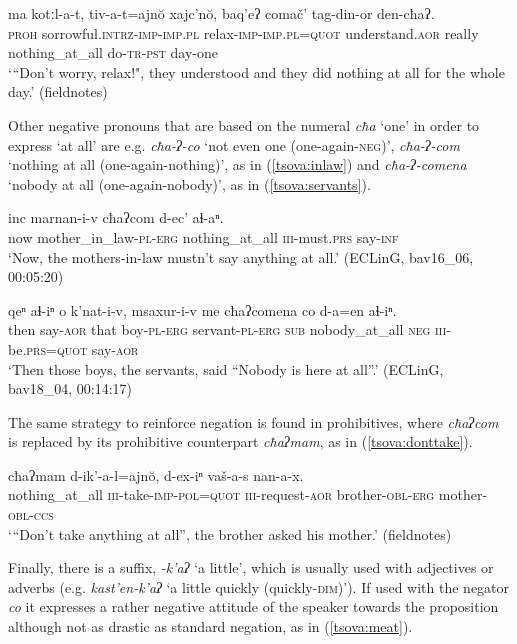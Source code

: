 \documentclass[output=paper,%
colorlinks,citecolor=brown,
showindex
]{langscibook}
\begin{document}
\ea	\label{tsova:relax}
\gll 	ma kotːl-a-t, tiv-a-t=ajnŏ xajc'nŏ, baq'eʔ comač' tag-din-or den-cħaʔ. \\
	\textsc{proh} sorrowful.\textsc{intrz}-\textsc{imp-imp.pl} relax-\textsc{imp-imp.pl=quot} understand.\textsc{aor} really nothing\_at\_all do-\textsc{tr}-\textsc{pst} day-one\\
\glt `“Don't worry, relax!", they understood and they did nothing at all for the whole day.'  (fieldnotes)
\z

Other negative pronouns that are based on the numeral \textit{cħa} `one' in order to express `at all' are e.g.   \textit{cħa-ʔ-co} `not even one (one-again-\textsc{neg})', \textit{cħa-ʔ-com} `nothing at all (one-again-nothing)', as in (\ref{tsova:inlaw}) and \textit{cħa-ʔ-comena}  `nobody at all (one-again-nobody)', as in (\ref{tsova:servants}).

\ea	\label{tsova:inlaw}
\gll 	inc marnan-i-v cħaʔcom d-ec' aɬ-aⁿ.\\  
	now mother\_in\_law-\textsc{pl-erg} nothing\_at\_all \textsc{iii}-must.\textsc{prs} say-\textsc{inf}\\
\glt `Now, the mothers-in-law mustn't say anything at all.' (ECLinG, bav16\_06, 00:05:20)
\z

\ea	\label{tsova:servants}
\gll 	qeⁿ aɬ-iⁿ o k'nat-i-v, msaxur-i-v me cħaʔcomena co d-a=en aɬ-iⁿ.\\
	then say-\textsc{aor} that boy-\textsc{pl-erg} servant-\textsc{pl-erg} \textsc{sub} nobody\_at\_all \textsc{neg} \textsc{iii}-be.\textsc{prs=quot} say-\textsc{aor}\\
\glt `Then those boys, the servants, said ``Nobody is here at all''.' (ECLinG, bav18\_04, 00:14:17)
\z

The same strategy to reinforce negation is found in prohibitives, where \mbox{\textit{cħaʔcom}} is replaced by its prohibitive counterpart \textit{cħaʔmam}, as in (\ref{tsova:donttake}).

\ea	\label{tsova:donttake}
\gll 	cħaʔmam d-ik'-a-l=ajnŏ, d-ex-iⁿ vaš-a-s nan-a-x.\\
	nothing\_at\_all \textsc{iii}-take-\textsc{imp-pol=quot} \textsc{iii}-request-\textsc{aor} brother-\textsc{obl-erg} mother-\textsc{obl-ccs}\\
\glt `“Don't take anything at all'', the brother asked his mother.' (fieldnotes) 
\z
    
Finally, there is a suffix, \textit{-k'aʔ} `a little', which is usually used with adjectives or adverbs (e.g. \textit{kast'en-k'aʔ}  `a little quickly (quickly-\textsc{dim})'). If used with the negator \textit{co} it expresses a rather negative attitude of the speaker towards the proposition although not as drastic as standard negation, as in (\ref{tsova:meat}).
    
\end{document}
